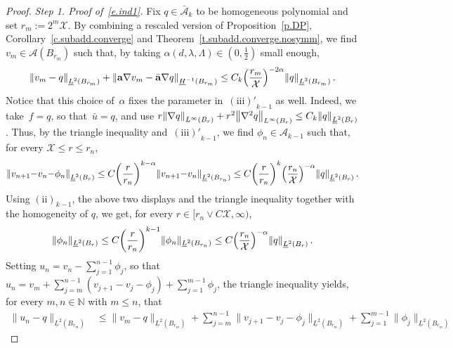 \documentclass[11pt]{article} %
\numberwithin{equation}{section}
\theoremstyle{definition}
\let\originalleft\left
\let\originalright\right
\renewcommand{\left}{\mathopen{}\mathclose\bgroup\originalleft}
\renewcommand{\right}{\aftergroup\egroup\originalright}
\newcommand*{\N}{\ensuremath{\mathbb{N}}}
\renewcommand{\a}{\mathbf{a}}
\newcommand{\ahom}{\bar{\a}}
\newcommand{\X}{\mathcal{X}}
\newcommand{\A}{\mathcal{A}}
\newcommand{\Ahom}{\bar{\A}}
\begin{document}
\begin{proof}
\smallskip

\emph{Step 1. Proof of~\eqref{e.ind1}.} Fix $q \in \Ahom_k$ to be homogeneous polynomial and set $r_m := 2^m \X$. By combining a rescaled version of Proposition~\ref{p.DP}, Corollary~\ref{c.subadd.converge} and Theorem~\ref{t.subadd.converge.nosymm}, we find $v_m \in \A(B_{r_m})$ such that, by taking $\alpha(d,\lambda,\Lambda) \in (0,\frac12)$ small enough,  
\begin{equation} \label{e.Ckone.fixalpha}
\left\| v_{m} - q \right\|_{\underline{L}^2(B_{r_m})} 
+ 
\left\|  \a \nabla v_m - \ahom \nabla q \right\|_{\underline{H}^{-1}(B_{r_m})} 
\leq 
C_k \Bigl( \frac{r_m}{\X} \Bigr)^{-2\alpha} \left\| q \right\|_{\underline{L}^2(B_{r_m})}
\, .
\end{equation}
Notice that this choice of~$\alpha$ fixes the parameter in~$\mathrm{(iii)'}_{k-1}$ as well. 
Indeed, we take~$f = q$, so that~$\bar u = q$, and use $r \left\| \nabla q \right\|_{L^\infty(B_r)} + r^2 \left\| \nabla^2 q \right\|_{L^\infty(B_r)} \leq C_k \left\| q \right\|_{\underline{L}^2(B_r)}$. 
Thus, by the triangle inequality and~$\mathrm{(iii)'}_{k-1}$, we find $\phi_{n} \in \A_{k-1}$ such that, for every $ \X \leq r \leq r_n$,   
\begin{align*}  
\left\| v_{n+1} {-} v_{n} {-} \phi_{n} \right\|_{\underline{L}^2(B_r)}   
\leq 
C
\left(\frac{r}{r_n}\right)^{k-\alpha}  \left\| v_{n+1} {-} v_{n} \right\|_{\underline{L}^2(B_{r_n})} 
\leq 
C\left(\frac{r}{r_n}\right)^{k} \Bigl( \frac{r_n}{\X} \Bigr)^{-\alpha}  \left\| q \right\|_{\underline{L}^2(B_r)}
\,.
\end{align*}
Using $\mathrm{(ii)}_{k-1}$, the above two displays and the triangle inequality together with the homogeneity of $q$, we get, for every $r \in [r_n \vee C\X,\infty)$,  
\begin{equation*}  
\| \phi_{n} \|_{\underline{L}^2(B_r)} 
\leq 
C\left( \frac{r}{r_n} \right)^{k-1} \| \phi_{n}  \|_{\underline{L}^2(B_{r_n})} 
\leq 
C \Bigl( \frac{r_n}{\X} \Bigr)^{-\alpha}  \left\| q \right\|_{\underline{L}^2(B_{r})}
\,.
\end{equation*}
Setting $u_n = v_n - \sum_{j=1}^{n-1} \phi_j$, so that $u_n = v_m +  \sum_{j=m}^{n-1}(v_{j+1} - v_j -\phi_j) + \sum_{j=1}^{m-1} \phi_j$,  the triangle inequality yields, for every $m,n \in \N$ with $m \leq n$, that
\begin{align*}  
\| u_n - q \|_{\underline{L}^2(B_{r_m})}  
& \leq 
\| v_m - q \|_{\underline{L}^2(B_{r_m})} 
+ \sum_{j=m}^{n-1}  \| v_{j+1} {-} v_j {-} \phi_j \|_{\underline{L}^2(B_{r_m})}
+ \sum_{j=1}^{m-1}\| \phi_j \|_{\underline{L}^2(B_{r_m})}

\end{align*}
\end{proof}
\end{document}
